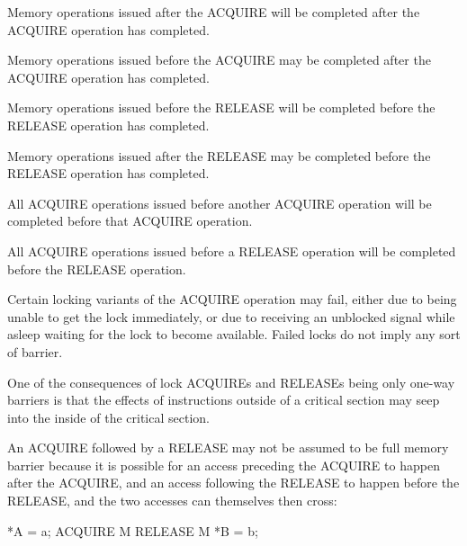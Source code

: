 \begin{description}[style=nextline]
 \item[ACQUIRE operation implication:]
     Memory operations issued after the ACQUIRE will be completed after the
     ACQUIRE operation has completed.

     Memory operations issued before the ACQUIRE may be completed after
     the ACQUIRE operation has completed.

 \item[RELEASE operation implication:]
     Memory operations issued before the RELEASE will be completed before the
     RELEASE operation has completed.

     Memory operations issued after the RELEASE may be completed before the
     RELEASE operation has completed.

 \item[ACQUIRE vs ACQUIRE implication:]
     All ACQUIRE operations issued before another ACQUIRE operation will be
     completed before that ACQUIRE operation.

 \item[ACQUIRE vs RELEASE implication:]
     All ACQUIRE operations issued before a RELEASE operation will be
     completed before the RELEASE operation.

 \item[Failed conditional ACQUIRE implication:]
     Certain locking variants of the ACQUIRE operation may fail, either due to
     being unable to get the lock immediately, or due to receiving an unblocked
     signal while asleep waiting for the lock to become available.
     Failed locks do not imply any sort of barrier.
\end{description}

\begin{Note}
One of the consequences of lock ACQUIREs and RELEASEs being only
one-way barriers is that the effects of instructions outside of a critical
section may seep into the inside of the critical section.
\end{Note}

An ACQUIRE followed by a RELEASE may not be assumed to be full memory barrier
because it is possible for an access preceding the ACQUIRE to happen after the
ACQUIRE, and an access following the RELEASE to happen before the RELEASE, and
the two accesses can themselves then cross:

\begin{VerbatimU}
	*A = a;
	ACQUIRE M
	RELEASE M
	*B = b;
\end{VerbatimU}

